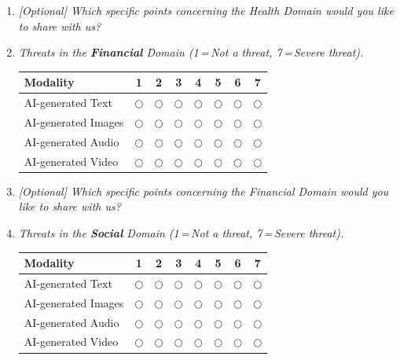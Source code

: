 \begin{enumerate}[label=\textbf{Q\arabic*.}, leftmargin=3em]
    \item \textit{[Optional] Which specific points concerning the Health Domain would you like to share with us?}\\[2pt]
    \framebox[\linewidth]{\rule{0pt}{2em}}

    \item \textit{Threats in the \textbf{Financial} Domain (1\,=\,Not a threat, 7\,=\,Severe threat).}

    \medskip
    \noindent\begin{tabular}{l ccccccc}
    \toprule
    \textbf{Modality} & \textbf{1} & \textbf{2} & \textbf{3} & \textbf{4} & \textbf{5} & \textbf{6} & \textbf{7} \\
    \midrule
    AI-generated Text   & $\bigcirc$ & $\bigcirc$ & $\bigcirc$ & $\bigcirc$ & $\bigcirc$ & $\bigcirc$ & $\bigcirc$ \\
    AI-generated Images & $\bigcirc$ & $\bigcirc$ & $\bigcirc$ & $\bigcirc$ & $\bigcirc$ & $\bigcirc$ & $\bigcirc$ \\
    AI-generated Audio  & $\bigcirc$ & $\bigcirc$ & $\bigcirc$ & $\bigcirc$ & $\bigcirc$ & $\bigcirc$ & $\bigcirc$ \\
    AI-generated Video  & $\bigcirc$ & $\bigcirc$ & $\bigcirc$ & $\bigcirc$ & $\bigcirc$ & $\bigcirc$ & $\bigcirc$ \\
    \bottomrule
    \end{tabular}

    \item \textit{[Optional] Which specific points concerning the Financial Domain would you like to share with us?}\\[2pt]
    \framebox[\linewidth]{\rule{0pt}{2em}}

    \item \textit{Threats in the \textbf{Social} Domain (1\,=\,Not a threat, 7\,=\,Severe threat).}

    \medskip
    \noindent\begin{tabular}{l ccccccc}
    \toprule
    \textbf{Modality} & \textbf{1} & \textbf{2} & \textbf{3} & \textbf{4} & \textbf{5} & \textbf{6} & \textbf{7} \\
    \midrule
    AI-generated Text   & $\bigcirc$ & $\bigcirc$ & $\bigcirc$ & $\bigcirc$ & $\bigcirc$ & $\bigcirc$ & $\bigcirc$ \\
    AI-generated Images & $\bigcirc$ & $\bigcirc$ & $\bigcirc$ & $\bigcirc$ & $\bigcirc$ & $\bigcirc$ & $\bigcirc$ \\
    AI-generated Audio  & $\bigcirc$ & $\bigcirc$ & $\bigcirc$ & $\bigcirc$ & $\bigcirc$ & $\bigcirc$ & $\bigcirc$ \\
    AI-generated Video  & $\bigcirc$ & $\bigcirc$ & $\bigcirc$ & $\bigcirc$ & $\bigcirc$ & $\bigcirc$ & $\bigcirc$ \\
    \bottomrule
    \end{tabular}


\end{enumerate}
